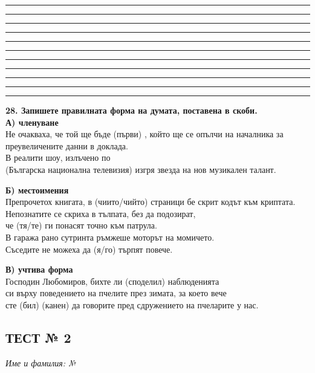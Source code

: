 \documentclass[12pt,a4paper]{article}
\begin{document}
\vspace{0.2cm}
\noindent\rule{\linewidth}{0.4pt}
\noindent\rule{\linewidth}{0.4pt}
\noindent\rule{\linewidth}{0.4pt}
\noindent\rule{\linewidth}{0.4pt}
\noindent\rule{\linewidth}{0.4pt}
\noindent\rule{\linewidth}{0.4pt}
\noindent\rule{\linewidth}{0.4pt}
\noindent\rule{\linewidth}{0.4pt}
\noindent\rule{\linewidth}{0.4pt}
\noindent\rule{\linewidth}{0.4pt}
\noindent\rule{\linewidth}{0.4pt}

\vspace{0.6cm}

\noindent
\textbf{28. Запишете правилната форма на думата, поставена в скоби.} \\
\noindent
\textbf{А) членуване} \\
Не очакваха, че той ще бъде (първи) \dotfill , който ще се опълчи на началника за преувеличените данни в доклада. \\
В реалити шоу, излъчено по \\(Българска национална телевизия) \dotfill  изгря звезда на нов музикален талант.

\vspace{0.2cm}
\noindent
\textbf{Б) местоимения} \\
Препрочетох книгата, в (чиито/чийто) \dotfill  страници бе скрит кодът към криптата. \\
Непознатите се скриха в тълпата, без да подозират,\\ че (тя/те) \dotfill  ги понасят точно към патрула. \\
В гаража рано сутринта ръмжеше моторът на момичето.\\ Съседите не можеха да (я/го) \dotfill  търпят повече.

\vspace{0.2cm}
\noindent
\textbf{В) учтива форма} \\
Господин Любомиров, бихте ли (споделил) \dotfill  наблюденията\\ си върху поведението на пчелите през зимата, за което вече\\ сте (бил) \dotfill  (канен) \dotfill да говорите пред сдружението на пчеларите у нас.

\newpage
\subsection{ТЕСТ № 2}

\noindent
\textit{Име и фамилия:} \dotfill \textit{№} \makebox[2cm]{\dotfill}

\vspace{0.6cm}
\end{document}
